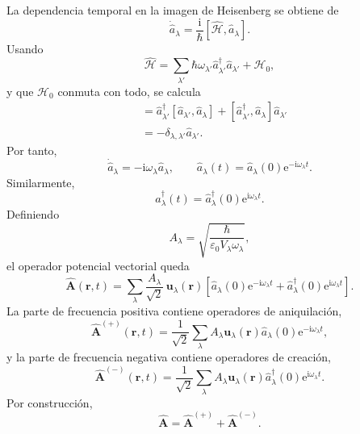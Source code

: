 \documentclass[11pt]{article}
\newcommand{\ii}{\mathrm{i}}
\newcommand{\ee}{\mathrm{e}}
\newcommand{\vb}[1]{\mathbf{#1}}
\begin{document}
La dependencia temporal en la imagen de Heisenberg se obtiene de
\begin{equation}
  \dot{\hat a}_\lambda
  =
  \frac{\ii}{\hbar}
  [\hat{\mathcal H},\hat a_\lambda].
\end{equation}
Usando
\begin{equation}
  \hat{\mathcal H}
  =
  \sum_{\lambda'}
  \hbar\omega_{\lambda'}
  \hat a_{\lambda'}^\dagger\hat a_{\lambda'}
  +
  \mathcal H_0,
\end{equation}
y que $\mathcal H_0$ conmuta con todo, se calcula
\begin{align}
  [\hat a_{\lambda'}^\dagger\hat a_{\lambda'},\hat a_\lambda]
  &=
  \hat a_{\lambda'}^\dagger
  [\hat a_{\lambda'},\hat a_\lambda]
  +
  [\hat a_{\lambda'}^\dagger,\hat a_\lambda]\hat a_{\lambda'}\\
  &=
  -\delta_{\lambda,\lambda'}\hat a_{\lambda'}.
\end{align}
Por tanto,
\begin{equation}
  \dot{\hat a}_\lambda
  =
  -\ii\omega_\lambda\hat a_\lambda,
  \qquad
  \hat a_\lambda(t)
  =
  \hat a_\lambda(0)\ee^{-\ii\omega_\lambda t}.
\end{equation}
Similarmente,
\begin{equation}
  \hat a_\lambda^\dagger(t)
  =
  \hat a_\lambda^\dagger(0)\ee^{\ii\omega_\lambda t}.
\end{equation}
Definiendo
\begin{equation}
  A_\lambda
  =
  \sqrt{\frac{\hbar}{\varepsilon_0V_\lambda\omega_\lambda}},
\end{equation}
el operador potencial vectorial queda
\begin{equation}
  \boxed{
  \hat{\vb A}(\vb r,t)
  =
  \sum_\lambda
  \frac{A_\lambda}{\sqrt2}\,
  \vb u_\lambda(\vb r)
  \left[
  \hat a_\lambda(0)\ee^{-\ii\omega_\lambda t}
  +
  \hat a_\lambda^\dagger(0)\ee^{\ii\omega_\lambda t}
  \right].
  }
\end{equation}
La parte de frecuencia positiva contiene operadores de aniquilaci\'on,
\begin{equation}
  \hat{\vb A}^{(+)}(\vb r,t)
  =
  \frac{1}{\sqrt2}
  \sum_\lambda
  A_\lambda
  \vb u_\lambda(\vb r)
  \hat a_\lambda(0)\ee^{-\ii\omega_\lambda t},
\end{equation}
y la parte de frecuencia negativa contiene operadores de creaci\'on,
\begin{equation}
  \hat{\vb A}^{(-)}(\vb r,t)
  =
  \frac{1}{\sqrt2}
  \sum_\lambda
  A_\lambda
  \vb u_\lambda(\vb r)
  \hat a_\lambda^\dagger(0)\ee^{\ii\omega_\lambda t}.
\end{equation}
Por construcci\'on,
\begin{equation}
  \hat{\vb A}=\hat{\vb A}^{(+)}+\hat{\vb A}^{(-)}.
\end{equation}
\end{document}
